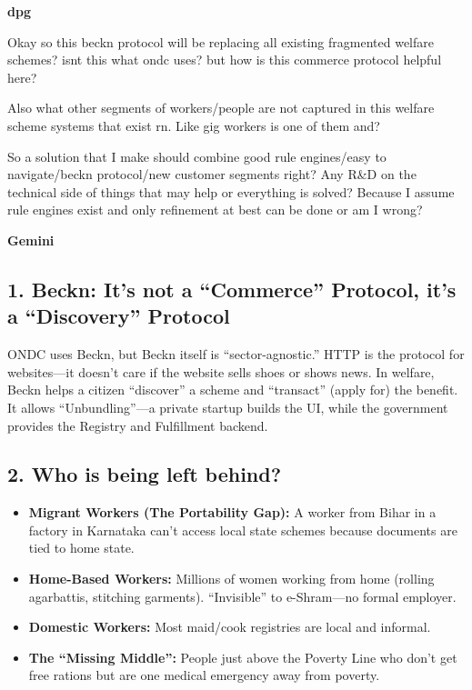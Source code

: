 \documentclass[11pt,a4paper]{article}
\begin{document}
{\small\color{primary}\textbf{dpg}}
\begin{mebox}
Okay so this beckn protocol will be replacing all existing fragmented welfare schemes? isnt this what ondc uses? but how is this commerce protocol helpful here?

Also what other segments of workers/people are not captured in this welfare scheme systems that exist rn. Like gig workers is one of them and?

So a solution that I make should combine good rule engines/easy to navigate/beckn protocol/new customer segments right? Any R\&D on the technical side of things that may help or everything is solved? Because I assume rule engines exist and only refinement at best can be done or am I wrong?
\end{mebox}

{\small\color{secondary}\textbf{Gemini}}\vspace{2pt}

\subsection*{1. Beckn: It's not a ``Commerce'' Protocol, it's a ``Discovery'' Protocol}
ONDC uses Beckn, but Beckn itself is ``sector-agnostic.'' HTTP is the protocol for websites---it doesn't care if the website sells shoes or shows news. In welfare, Beckn helps a citizen ``discover'' a scheme and ``transact'' (apply for) the benefit. It allows ``Unbundling''---a private startup builds the UI, while the government provides the Registry and Fulfillment backend.

\subsection*{2. Who is being left behind?}
\begin{itemize}[nosep]
\item \textbf{Migrant Workers (The Portability Gap):} A worker from Bihar in a factory in Karnataka can't access local state schemes because documents are tied to home state.
\item \textbf{Home-Based Workers:} Millions of women working from home (rolling agarbattis, stitching garments). ``Invisible'' to e-Shram---no formal employer.
\item \textbf{Domestic Workers:} Most maid/cook registries are local and informal.
\item \textbf{The ``Missing Middle'':} People just above the Poverty Line who don't get free rations but are one medical emergency away from poverty.
\end{itemize}
\end{document}
